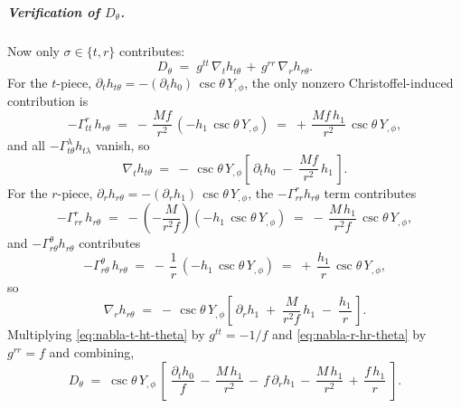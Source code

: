 \subparagraph{Verification of $D_{\theta}$.}
Now only $\sigma\in\{t,r\}$ contributes:
\begin{equation}
  D_{\theta}
  \;=\; g^{tt}\,\nabla_{t}h_{t\theta}
   \,+\, g^{rr}\,\nabla_{r}h_{r\theta}.
  \label{eq:Dtheta-decomp}
\end{equation}
For the $t$-piece, $\partial_{t}h_{t\theta}
= -(\partial_{t}h_{0})\,\csc\theta\,Y_{,\phi}$, the only nonzero
Christoffel-induced contribution is
\begin{equation}
  -\Gamma^{r}_{tt}\,h_{r\theta}
  \;=\; -\,\frac{Mf}{r^{2}}\,(-h_{1}\,\csc\theta\,Y_{,\phi})
  \;=\; +\,\frac{Mf\,h_{1}}{r^{2}}\,\csc\theta\,Y_{,\phi},
\end{equation}
and all $-\Gamma^{\lambda}_{t\theta}h_{t\lambda}$ vanish, so
\begin{equation}
  \nabla_{t}h_{t\theta}
  \;=\; -\,\csc\theta\,Y_{,\phi}\!
        \left[\,\partial_{t}h_{0}
              \;-\; \frac{Mf}{r^{2}}\,h_{1}\,\right].
  \label{eq:nabla-t-ht-theta}
\end{equation}
For the $r$-piece, $\partial_{r}h_{r\theta}
= -(\partial_{r}h_{1})\,\csc\theta\,Y_{,\phi}$, the
$-\Gamma^{r}_{rr}h_{r\theta}$ term contributes
\begin{equation}
  -\Gamma^{r}_{rr}\,h_{r\theta}
  \;=\; -\!\left(-\frac{M}{r^{2}f}\right)\!(-h_{1}\,\csc\theta\,Y_{,\phi})
  \;=\; -\,\frac{M\,h_{1}}{r^{2}f}\,\csc\theta\,Y_{,\phi},
\end{equation}
and $-\Gamma^{\theta}_{r\theta}h_{r\theta}$ contributes
\begin{equation}
  -\Gamma^{\theta}_{r\theta}\,h_{r\theta}
  \;=\; -\,\frac{1}{r}\,(-h_{1}\,\csc\theta\,Y_{,\phi})
  \;=\; +\,\frac{h_{1}}{r}\,\csc\theta\,Y_{,\phi},
\end{equation}
so
\begin{equation}
  \nabla_{r}h_{r\theta}
  \;=\; -\,\csc\theta\,Y_{,\phi}\!
        \left[\,\partial_{r}h_{1}
              \;+\; \frac{M}{r^{2}f}\,h_{1}
              \;-\; \frac{h_{1}}{r}\,\right].
  \label{eq:nabla-r-hr-theta}
\end{equation}
Multiplying \eqref{eq:nabla-t-ht-theta} by $g^{tt}=-1/f$ and
\eqref{eq:nabla-r-hr-theta} by $g^{rr}=f$ and combining,
\begin{equation}
  D_{\theta}
  \;=\; \csc\theta\,Y_{,\phi}\,
        \left[\;
          \frac{\partial_{t}h_{0}}{f}
          \,-\, \frac{M\,h_{1}}{r^{2}}
          \,-\, f\,\partial_{r}h_{1}
          \,-\, \frac{M\,h_{1}}{r^{2}}
          \,+\, \frac{f\,h_{1}}{r}
        \;\right].
  \label{eq:Dtheta-raw}
\end{equation}
